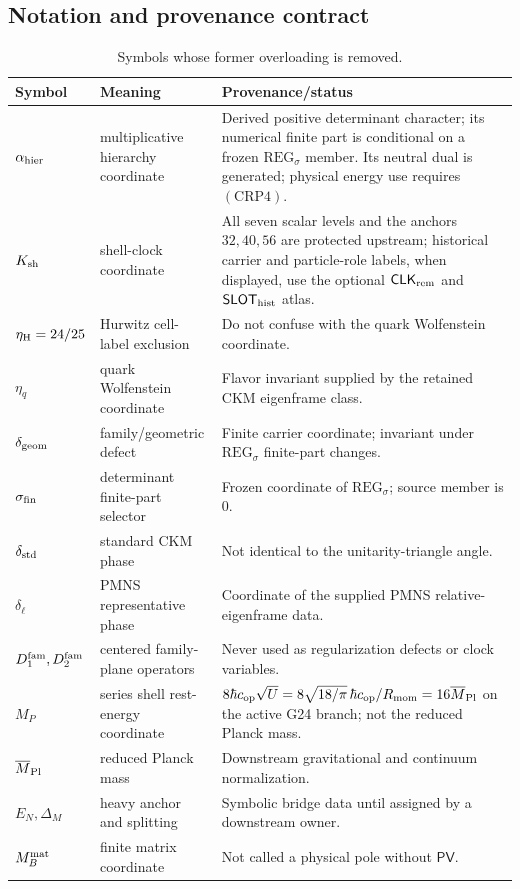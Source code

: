 \documentclass[11pt,a4paper]{article}
\newcommand{\CLKrem}{\mathsf{CLK}_{\rm rem}}
\newcommand{\etaH}{\eta_{\rm H}}
\begin{document}
\subsection{Notation and provenance contract}
\label{p6:sec:notation}

\begin{table}[H]
\centering
\caption{Symbols whose former overloading is removed.}
\label{p6:tab:notation}
\small
\renewcommand{\arraystretch}{1.12}
\begin{tabularx}{\textwidth}{@{}L{0.20\textwidth}L{0.28\textwidth}Y@{}}
\toprule
Symbol & Meaning & Provenance/status \\
\midrule
\(\alpha_{\rm hier}\) & multiplicative hierarchy coordinate &
Derived positive determinant character; its numerical finite part is
conditional on a frozen \(\mathrm{REG}_{\sigma}\) member.  Its neutral dual
is generated; physical energy use requires \((\mathrm{CRP4})\).\\
\(K_{\rm sh}\) & shell-clock coordinate &
All seven scalar levels and the anchors \(32,40,56\) are protected upstream;
historical carrier and particle-role labels, when displayed, use the optional
\(\CLKrem\) and \(\mathsf{SLOT}_{\rm hist}\) atlas.\\
\(\etaH=24/25\) & Hurwitz cell-label exclusion &
Do not confuse with the quark Wolfenstein coordinate.\\
\(\eta_q\) & quark Wolfenstein coordinate &
Flavor invariant supplied by the retained CKM eigenframe class.\\
\(\delta_{\rm geom}\) & family/geometric defect &
Finite carrier coordinate; invariant under \(\mathrm{REG}_{\sigma}\) finite-part changes.\\
\(\sigma_{\rm fin}\) & determinant finite-part selector &
Frozen coordinate of \(\mathrm{REG}_{\sigma}\); source member is \(0\).\\
\(\delta_{\rm std}\) & standard CKM phase &
Not identical to the unitarity-triangle angle.\\
\(\delta_\ell\) & PMNS representative phase &
Coordinate of the supplied PMNS relative-eigenframe data.\\
\(D^{\mathrm{fam}}_1,D^{\mathrm{fam}}_2\) & centered family-plane operators &
Never used as regularization defects or clock variables.\\
\(M_P\) & series shell rest-energy coordinate &
\(8\hbar c_{\rm op}\sqrt U=8\sqrt{18/\pi}\,\hbar c_{\rm op}/R_{\rm mom}=16\overline M_{\rm Pl}\)
on the active G24 branch; not the reduced Planck mass.\\
\(\overline M_{\rm Pl}\) & reduced Planck mass &
Downstream gravitational and continuum normalization.\\
\(E_N,\Delta_M\) & heavy anchor and splitting &
Symbolic bridge data until assigned by a downstream owner.\\
\(M_B^{\rm mat}\) & finite matrix coordinate &
Not called a physical pole without \(\mathsf{PV}\).\\
\bottomrule
\end{tabularx}
\end{table}
\end{document}
